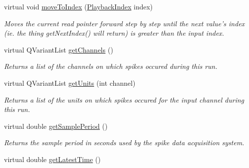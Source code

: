 \begin{DoxyCompactItemize}
virtual void \hyperlink{class_picto_1_1_spike_state_adff36be6aba208cd131b253926a18853}{move\-To\-Index} (\hyperlink{struct_picto_1_1_playback_index}{Playback\-Index} index)
\begin{DoxyCompactList}\small\item\em Moves the current read pointer forward step by step until the next value's index (ie. the thing get\-Next\-Index() will return) is greater than the input index. \end{DoxyCompactList}\item 
\hypertarget{class_picto_1_1_spike_state_affff57c009c9607eed048a6d523616c1}{virtual Q\-Variant\-List \hyperlink{class_picto_1_1_spike_state_affff57c009c9607eed048a6d523616c1}{get\-Channels} ()}\label{class_picto_1_1_spike_state_affff57c009c9607eed048a6d523616c1}

\begin{DoxyCompactList}\small\item\em Returns a list of the channels on which spikes occured during this run. \end{DoxyCompactList}\item 
\hypertarget{class_picto_1_1_spike_state_a037d3499f4a787ba4310b491be67c9d5}{virtual Q\-Variant\-List \hyperlink{class_picto_1_1_spike_state_a037d3499f4a787ba4310b491be67c9d5}{get\-Units} (int channel)}\label{class_picto_1_1_spike_state_a037d3499f4a787ba4310b491be67c9d5}

\begin{DoxyCompactList}\small\item\em Returns a list of the units on which spikes occured for the input channel during this run. \end{DoxyCompactList}\item 
\hypertarget{class_picto_1_1_spike_state_a8ac376fc10eb006d6980eac7a3ea609f}{virtual double \hyperlink{class_picto_1_1_spike_state_a8ac376fc10eb006d6980eac7a3ea609f}{get\-Sample\-Period} ()}\label{class_picto_1_1_spike_state_a8ac376fc10eb006d6980eac7a3ea609f}

\begin{DoxyCompactList}\small\item\em Returns the sample period in seconds used by the spike data acquisition system. \end{DoxyCompactList}\item 
\hypertarget{class_picto_1_1_spike_state_ab03a1c4261081a4561e1b16df6fe897c}{virtual double \hyperlink{class_picto_1_1_spike_state_ab03a1c4261081a4561e1b16df6fe897c}{get\-Latest\-Time} ()}\label{class_picto_1_1_spike_state_ab03a1c4261081a4561e1b16df6fe897c}


\end{DoxyCompactItemize}
